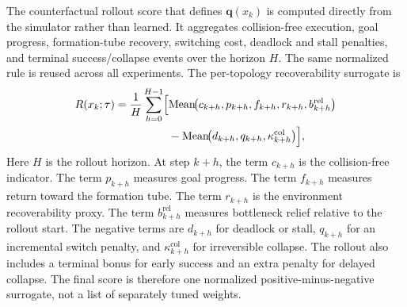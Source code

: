 \documentclass{ieeeaccess}
\begin{document}
The counterfactual rollout score that defines $\mathbf{q}(x_k)$ is
computed directly from the simulator rather than learned. It aggregates
collision-free execution, goal progress, formation-tube recovery,
switching cost, deadlock and stall penalties, and terminal
success/collapse events over the horizon $H$. The same normalized rule
is reused across all experiments. The per-topology recoverability
surrogate is
\begin{equation}
\begin{aligned}
R(x_k;\tau) = \frac{1}{H}\sum_{h=0}^{H-1}
\Bigl[
 &\mathrm{Mean}\!\bigl(c_{k+h},p_{k+h},f_{k+h},r_{k+h},b^{\mathrm{rel}}_{k+h}\bigr) \\
 &- \mathrm{Mean}\!\bigl(d_{k+h},q_{k+h},\kappa^{\mathrm{col}}_{k+h}\bigr)
\Bigr],
\end{aligned}
\label{eq:recoverability}
\end{equation}
Here $H$ is the rollout horizon. At step $k+h$, the term $c_{k+h}$ is
the collision-free indicator. The term $p_{k+h}$ measures goal
progress. The term $f_{k+h}$ measures return toward the formation tube.
The term $r_{k+h}$ is the environment recoverability proxy. The term
$b^{\mathrm{rel}}_{k+h}$ measures bottleneck relief relative to the
rollout start. The negative terms are $d_{k+h}$ for deadlock or stall,
$q_{k+h}$ for an incremental switch penalty, and
$\kappa^{\mathrm{col}}_{k+h}$ for irreversible collapse. The rollout
also includes a terminal bonus for early success and an extra penalty
for delayed collapse. The final score is therefore one normalized
positive-minus-negative surrogate, not a list of separately tuned
weights.
\end{document}
